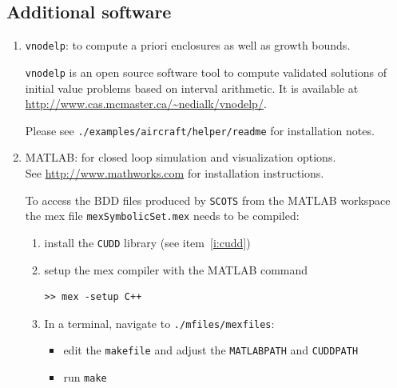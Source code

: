 \documentclass[a4paper]{amsart}
\begin{document}
\subsection{Additional software} 
\label{s:installation:cudd}
\begin{enumerate}

  \item {\tt vnodelp}: to compute a priori enclosures as well as growth bounds.

  {\tt vnodelp} is an open source software tool to compute validated solutions
  of initial value problems based on  interval arithmetic. It is available at
  \url{http://www.cas.mcmaster.ca/~nedialk/vnodelp/}.

  Please see {\tt ./examples/aircraft/helper/readme} for 
  installation notes.



  \item MATLAB: for closed loop simulation and visualization options.\\
	See \url{http://www.mathworks.com} for installation instructions.

	To access the BDD files produced by {\tt SCOTS} from the MATLAB workspace the
  mex file {\tt mexSymbolicSet.mex} needs to be compiled:
	\begin{enumerate}
  \item install the {\tt CUDD} library (see item~\ref{i:cudd})
 	\item setup the mex compiler with the MATLAB command
	\begin{lstlisting}[basicstyle=\small\ttfamily,frame=none]
	>> mex -setup C++
	\end{lstlisting}
	\item In a terminal, navigate to {\tt\small ./mfiles/mexfiles}:
	\begin{itemize}
		\item edit the {\tt makefile} and adjust the {\tt MATLABPATH} and {\tt CUDDPATH}
		\item run  {\tt make}
	 \end{itemize}
 \end{enumerate}


\end{enumerate}
\end{document}
